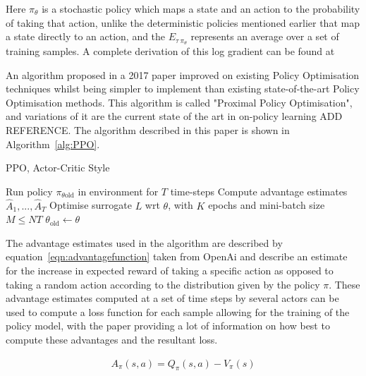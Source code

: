 \documentclass{article}
\begin{document}
Here $\pi_\theta$ is a stochastic policy which maps a state and an action to the probability of taking that action, unlike the deterministic policies mentioned earlier that map a state directly to an action, and the $E_{\tau ~ \pi_\theta}$ represents an average over a set of training samples. A complete derivation of this log gradient can be found at \cite{OpenAIOpenAIOptimisation}
 
An algorithm proposed in a 2017 paper\cite{Schulman2017ProximalAlgorithms} improved on existing Policy Optimisation techniques whilst being simpler to implement than existing state-of-the-art Policy Optimisation methods. This algorithm is called "Proximal Policy Optimisation", and variations of it are the current state of the art in on-policy learning ADD REFERENCE. The algorithm described in this paper is shown in Algorithm~\ref{alg:PPO}.

\begin{algorithm}
\caption{PPO, Actor-Critic Style \cite{Schulman2017ProximalAlgorithms}}\label{alg:PPO}
\begin{algorithmic}

        \State Run policy $\pi_{\theta \text{old}}$ in environment for $T$ time-steps
        \State Compute advantage estimates $\hat{A}_1,...,\hat{A}_T$
    \EndFor
    \State Optimise surrogate $L$ wrt $\theta$, with $K$ epochs and mini-batch size $M \le NT$
    \State $\theta_{\text{old}} \leftarrow \theta$
\EndFor


\end{algorithmic}
\end{algorithm}

The advantage estimates used in the algorithm are described by equation~\ref{eqn:advantagefunction} taken from OpenAi\cite{OpenAIOpenAIOptimisation} and describe an estimate for the increase in expected reward of taking a specific action as opposed to taking a random action according to the distribution given by the policy $\pi$. These advantage estimates computed at a set of time steps by several actors can be used to compute a loss function for each sample allowing for the training of the policy model\cite{Schulman2017ProximalAlgorithms}, with the paper providing a lot of information on how best to compute these advantages and the resultant loss. 

\begin{align}
\label{eqn:advantagefunction}
    A_\pi(s,a) = Q_\pi(s,a) - V_\pi(s) 
\end{align}
\end{document}
